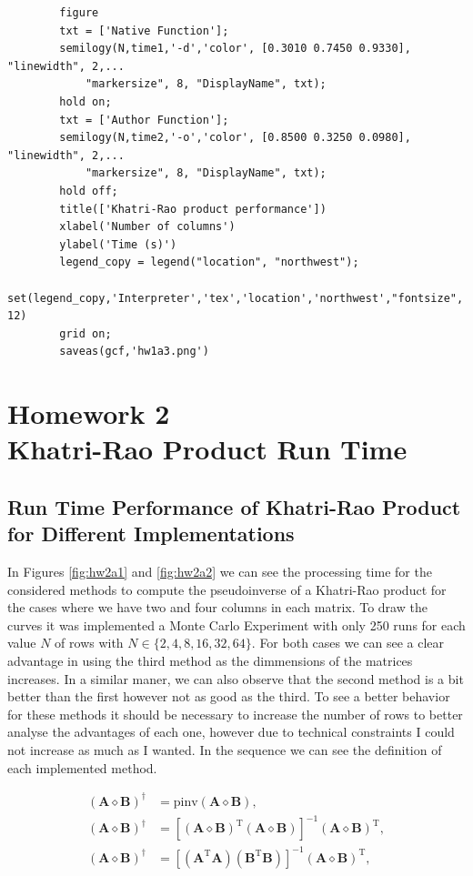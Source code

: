 \documentclass[a4paper,10pt]{article}
\begin{document}
\begin{verbatim}
        figure
        txt = ['Native Function'];
        semilogy(N,time1,'-d','color', [0.3010 0.7450 0.9330], "linewidth", 2,...
            "markersize", 8, "DisplayName", txt);
        hold on;
        txt = ['Author Function'];
        semilogy(N,time2,'-o','color', [0.8500 0.3250 0.0980], "linewidth", 2,...
            "markersize", 8, "DisplayName", txt);
        hold off;
        title(['Khatri-Rao product performance'])
        xlabel('Number of columns')
        ylabel('Time (s)')
        legend_copy = legend("location", "northwest");
        set(legend_copy,'Interpreter','tex','location','northwest',"fontsize", 12)
        grid on;
        saveas(gcf,'hw1a3.png')
    \end{verbatim}

\newpage
\section*{Homework 2 \\ Khatri-Rao Product Run Time}

    \subsection*{Run Time Performance of Khatri-Rao Product for Different Implementations}

    In Figures \ref{fig:hw2a1} and \ref{fig:hw2a2} we can see the processing time for the considered methods to compute the pseudoinverse of a Khatri-Rao product for the cases
    where we have two and four columns in each matrix. To draw the curves it was implemented a Monte Carlo Experiment with only 250 runs for each value $N$ of rows with $N \in \{2, 4, 8, 16, 32, 64\}$.
    For both cases we can see a clear advantage in using the third method as the dimmensions of the matrices increases. In a similar maner, we can also observe that the second method is a bit better than the first however 
    not as good as the third. To see a better behavior for these methods it should be necessary to increase the number of rows to better analyse the advantages of each one, however due to technical constraints 
    I could not increase as much as I wanted. In the sequence we can see the definition of each implemented method.

    \begin{align}
        (\boldsymbol{A} \diamond \boldsymbol{B})^{\dagger} &= \text{pinv}(\boldsymbol{A} \diamond \boldsymbol{B}), \\
        (\boldsymbol{A} \diamond \boldsymbol{B})^{\dagger} &= [(\boldsymbol{A} \diamond \boldsymbol{B})^{\text{T}} (\boldsymbol{A} \diamond \boldsymbol{B})]^{-1} (\boldsymbol{A} \diamond \boldsymbol{B})^{\text{T}}, \\
        (\boldsymbol{A} \diamond \boldsymbol{B})^{\dagger} &= [(\boldsymbol{A}^{\text{T}}\boldsymbol{A})(\boldsymbol{B}^{\text{T}}\boldsymbol{B})]^{-1} (\boldsymbol{A} \diamond \boldsymbol{B})^{\text{T}}, 
    \end{align}
\end{document}
